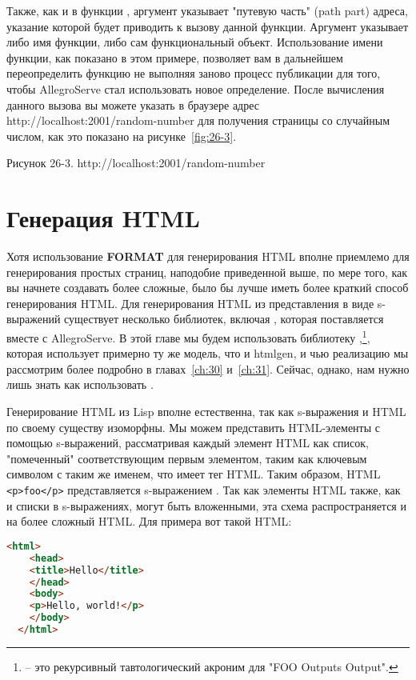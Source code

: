 Также, как и в функции , аргумент  указывает "путевую часть" (path part) адреса, указание которой будет приводить к вызову данной функции.  Аргумент  указывает либо имя функции, либо сам функциональный объект. Использование имени функции, как показано в этом примере, позволяет вам в дальнейшем переопределить функцию не выполняя заново процесс публикации для того, чтобы AllegroServe стал использовать новое определение. После вычисления данного вызова вы можете указать в браузере адрес http://localhost:2001/random-number для получения страницы со случайным числом, как это показано на рисунке~\ref{fig:26-3}.

Рисунок 26-3. http://localhost:2001/random-number

\section{Генерация HTML}

Хотя использование \textbf{FORMAT} для генерирования HTML вполне приемлемо для
генерирования простых страниц, наподобие приведенной выше, по мере того, как вы начнете
создавать более сложные, было бы лучше иметь более краткий способ генерирования HTML. Для
генерирования HTML из представления в виде s-выражений существует несколько библиотек,
включая , которая поставляется вместе с AllegroServe. В этой главе мы будем
использовать библиотеку ,\footnote{ -- это рекурсивный тавтологический
  акроним для "FOO Outputs Output".}, которая использует примерно ту же модель, что и
htmlgen, и чью реализацию мы рассмотрим более подробно в главах~\ref{ch:30}
и~\ref{ch:31}. Сейчас, однако, нам нужно лишь знать как использовать .

Генерирование HTML из Lisp вполне естественна, так как s-выражения и HTML по своему
существу изоморфны. Мы можем представить HTML-элементы с помощью s-выражений, рассматривая
каждый элемент HTML как список, "помеченный" соответствующим первым элементом, таким как
ключевым символом с таким же именем, что имеет тег HTML. Таким образом, HTML
\lstinline!<p>foo</p>! представляется s-выражением . Так как элементы
HTML также, как и списки в s-выражениях, могут быть вложенными, эта схема распространяется
и на более сложный HTML. Для примера вот такой HTML:

\begin{lstlisting}[language=HTML]
  <html>
    <head>
    <title>Hello</title>
    </head>
    <body>
    <p>Hello, world!</p>
    </body>
  </html>
\end{lstlisting}

